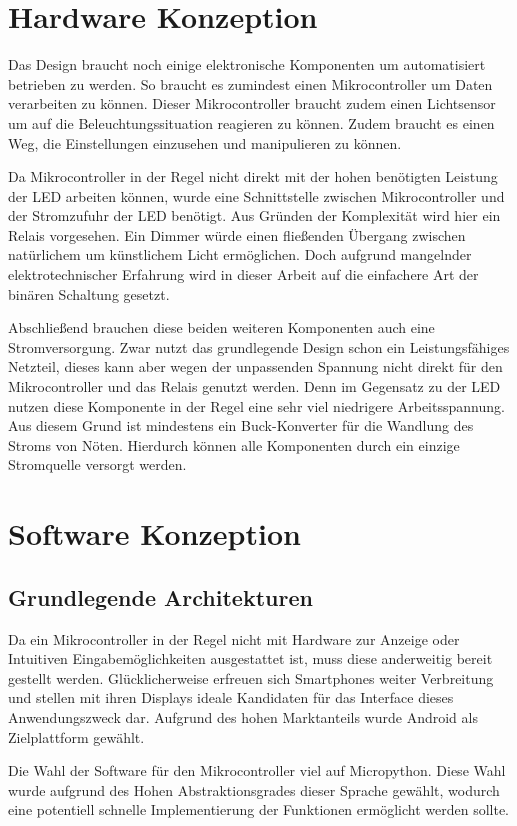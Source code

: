 \section{Hardware Konzeption}
Das Design braucht noch einige elektronische Komponenten um automatisiert betrieben zu werden. So braucht es zumindest einen Mikrocontroller um Daten verarbeiten zu können. Dieser Mikrocontroller braucht zudem einen Lichtsensor um auf die Beleuchtungssituation reagieren zu können. Zudem braucht es einen Weg, die Einstellungen einzusehen und manipulieren zu können. 

Da Mikrocontroller in der Regel nicht direkt mit der hohen benötigten Leistung der LED arbeiten können, wurde eine Schnittstelle zwischen Mikrocontroller und der Stromzufuhr der LED benötigt. Aus Gründen der Komplexität wird hier ein Relais vorgesehen. Ein Dimmer würde einen fließenden Übergang zwischen natürlichem um künstlichem Licht ermöglichen. Doch aufgrund mangelnder elektrotechnischer Erfahrung wird in dieser Arbeit auf die einfachere Art der binären Schaltung gesetzt.

Abschließend brauchen diese beiden weiteren Komponenten auch eine Stromversorgung. Zwar nutzt das grundlegende Design schon ein Leistungsfähiges Netzteil, dieses kann aber wegen der unpassenden Spannung nicht direkt für den Mikrocontroller und das Relais genutzt werden. Denn im Gegensatz zu der LED nutzen diese Komponente in der Regel eine sehr viel niedrigere Arbeitsspannung. Aus diesem Grund ist mindestens ein Buck-Konverter für die Wandlung des Stroms von Nöten. Hierdurch können alle Komponenten durch ein einzige Stromquelle versorgt werden.

\section{Software Konzeption}

\subsection{Grundlegende Architekturen}
Da ein Mikrocontroller in der Regel nicht mit Hardware zur Anzeige oder Intuitiven Eingabemöglichkeiten ausgestattet ist, muss diese anderweitig bereit gestellt werden. Glücklicherweise erfreuen sich Smartphones weiter Verbreitung und stellen mit ihren Displays ideale Kandidaten für das Interface dieses Anwendungszweck dar. Aufgrund des hohen Marktanteils wurde Android als Zielplattform gewählt.

Die Wahl der Software für den Mikrocontroller viel auf Micropython. Diese Wahl wurde aufgrund des Hohen Abstraktionsgrades dieser Sprache gewählt, wodurch eine potentiell schnelle Implementierung der Funktionen ermöglicht werden sollte.

